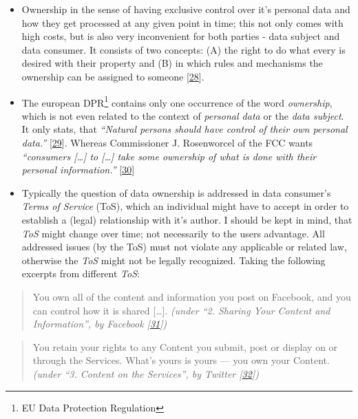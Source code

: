 \documentclass[12pt,english,a4paper,titlepage,cleardoublepage=empty,dottedtoc]{report}
\begin{document}
\begin{itemize}
\item
  Ownership in the sense of having exclusive control over it's personal
  data and how they get processed at any given point in time; this not
  only comes with high costs, but is also very inconvenient for both
  parties - data subject and data consumer. It consists of two
  \protect\hypertarget{def-ownership}{}{concepts}: (A) the right to do
  what every is desired with their property and (B) in which rules and
  mechanisms the ownership can be assigned to someone
  {[}\protect\hyperlink{ref-book_1987_private-ownership_definition}{28}{]}.
\item
  The european DPR\footnote{EU Data Protection Regulation} contains only
  one occurrence of the word \emph{ownership}, which is not even related
  to the context of \emph{personal data} or the \emph{data subject}. It
  only stats, that \emph{``Natural persons should have control of their
  own personal data.''}
  {[}\protect\hyperlink{ref-regulation_2016_eu_general-data-protection-regulation_ownership}{29}{]}.
  Whereas Commissioner J. Rosenworcel of the FCC wants \emph{``consumers
  {[}\ldots{}{]} to {[}\ldots{}{]} take some ownership of what is done
  with their personal information.''}
  {[}\protect\hyperlink{ref-rules_2016_fcc_to-protect-broadband-consumer-privacy_ownership}{30}{]}
\item
  Typically the question of data ownership is addressed in data
  consumer's \emph{Terms of Service} (ToS), which an individual might
  have to accept in order to establish a (legal) relationship with it's
  author. I should be kept in mind, that \emph{ToS} might change over
  time; not necessarily to the users advantage. All addressed issues (by
  the ToS) must not violate any applicable or related law, otherwise the
  \emph{ToS} might not be legally recognized. Taking the following
  excerpts from different \emph{ToS}:
\end{itemize}

\begin{quote}
You own all of the content and information you post on Facebook, and you
can control how it is shared {[}\ldots{}{]}. \emph{(under ``2. Sharing
Your Content and Information'', by Facebook
{[}\protect\hyperlink{ref-web_2016_facebook_terms-of-service}{31}{]})}
\end{quote}

\begin{quote}
You retain your rights to any Content you submit, post or display on or
through the Services. What's yours is yours --- you own your Content.
\emph{(under ``3. Content on the Services'', by Twitter
{[}\protect\hyperlink{ref-web_2016_twitter_terms-of-service}{32}{]})}
\end{quote}
\end{document}
